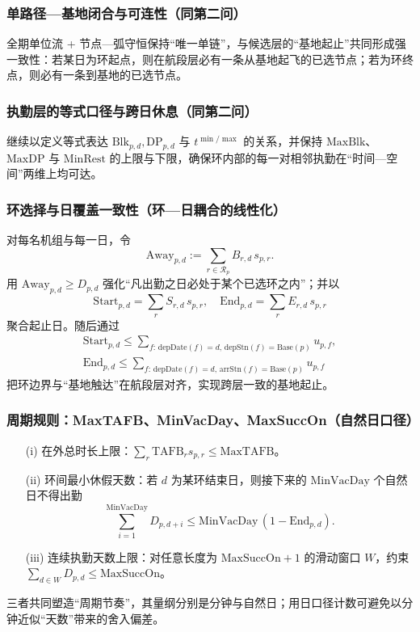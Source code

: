 \documentclass{article}
\begin{document}
\subsubsection{单路径—基地闭合与可连性（同第二问）}
全期单位流 + 节点—弧守恒保持“唯一单链”，与候选层的“基地起止”共同形成强一致性：若某日为环起点，则在航段层必有一条从基地起飞的已选节点；若为环终点，则必有一条到基地的已选节点。

\subsubsection{执勤层的等式口径与跨日休息（同第二问）}
继续以定义等式表达 $\mathrm{Blk}_{p,d}, \mathrm{DP}_{p,d}$ 与 $t^{\min/\max}$ 的关系，并保持 $\mathrm{MaxBlk}$、$\mathrm{MaxDP}$ 与 $\mathrm{MinRest}$ 的上限与下限，确保环内部的每一对相邻执勤在“时间—空间”两维上均可达。

\subsubsection{环选择与日覆盖一致性（环—日耦合的线性化）}
对每名机组与每一日，令
\begin{equation}
\mathrm{Away}_{p,d}:=\sum_{r\in\mathcal{R}_p} B_{r,d}\,s_{p,r}.
\end{equation}
用 $\mathrm{Away}_{p,d} \ge D_{p,d}$ 强化“凡出勤之日必处于某个已选环之内”；并以
\begin{equation}
\mathrm{Start}_{p,d}=\sum_{r} S_{r,d}\,s_{p,r}, \quad 
\mathrm{End}_{p,d}=\sum_{r} E_{r,d}\,s_{p,r}
\end{equation}
聚合起止日。随后通过
\begin{gather}
\mathrm{Start}_{p,d} \le \sum_{f:\,\mathrm{depDate}(f)=d,\,\mathrm{depStn}(f)=\mathrm{Base}(p)} u_{p,f}, \\
\mathrm{End}_{p,d} \le \sum_{f:\,\mathrm{depDate}(f)=d,\,\mathrm{arrStn}(f)=\mathrm{Base}(p)} u_{p,f}
\end{gather}
把环边界与“基地触达”在航段层对齐，实现跨层一致的基地起止。

\subsubsection{周期规则：MaxTAFB、MinVacDay、MaxSuccOn（自然日口径）}
\begin{enumerate}
    \item[(i)] 在外总时长上限：$\sum_{r}\mathrm{TAFB}_r s_{p,r} \le \mathrm{MaxTAFB}$。
    \item[(ii)] 环间最小休假天数：若 $d$ 为某环结束日，则接下来的 $\mathrm{MinVacDay}$ 个自然日不得出勤
    \begin{equation}
    \sum_{i=1}^{\mathrm{MinVacDay}} D_{p,d+i} \le \mathrm{MinVacDay}\,(1-\mathrm{End}_{p,d}).
    \end{equation}
    \item[(iii)] 连续执勤天数上限：对任意长度为 $\mathrm{MaxSuccOn}+1$ 的滑动窗口 $W$，约束 $\sum_{d\in W} D_{p,d} \le \mathrm{MaxSuccOn}$。
\end{enumerate}
三者共同塑造“周期节奏”，其量纲分别是分钟与自然日；用日口径计数可避免以分钟近似“天数”带来的舍入偏差。
\end{document}
